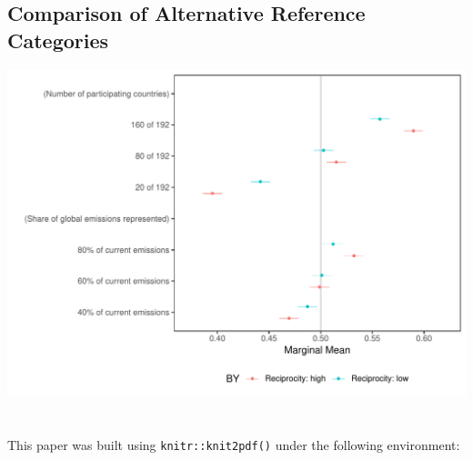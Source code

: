 \documentclass[a4paper,12pt]{article}\usepackage[]{graphicx}\usepackage[]{color}
\makeatletter
\def\maxwidth{ %
  \ifdim\Gin@nat@width>\linewidth
    \linewidth
  \else
    \Gin@nat@width
  \fi
}
\newenvironment{knitrout}{}{} %
\makeatother
\begin{document}
\clearpage


\subsection{Comparison of Alternative Reference Categories}


\begin{knitrout}
\color{fgcolor}
\includegraphics[width=\maxwidth]{figure/bechtel_reciprocity_reference-1} 

\end{knitrout}

\clearpage

\section*{}

\noindent This paper was built using \texttt{knitr::knit2pdf()} under the following environment:
\end{document}
